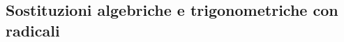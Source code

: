 \subsection{Sostituzioni algebriche e trigonometriche con radicali}
\label{sec:esercizi-integrali-sostituzioni-con-radicali}
